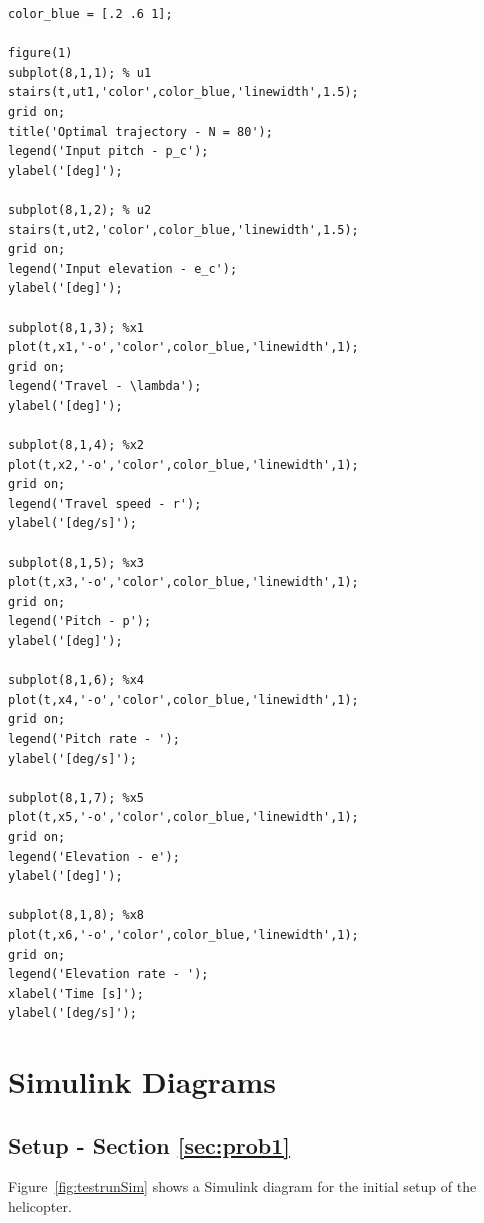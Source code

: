 \documentclass[11pt,a4paper,USenglish]{article} %
\begin{document}
\begin{verbatim}
color_blue = [.2 .6 1];

figure(1)
subplot(8,1,1); % u1
stairs(t,ut1,'color',color_blue,'linewidth',1.5);
grid on;
title('Optimal trajectory - N = 80');
legend('Input pitch - p_c');
ylabel('[deg]');

subplot(8,1,2); % u2
stairs(t,ut2,'color',color_blue,'linewidth',1.5);
grid on;
legend('Input elevation - e_c');
ylabel('[deg]');

subplot(8,1,3); %x1
plot(t,x1,'-o','color',color_blue,'linewidth',1);
grid on;
legend('Travel - \lambda');
ylabel('[deg]');

subplot(8,1,4); %x2
plot(t,x2,'-o','color',color_blue,'linewidth',1);
grid on;
legend('Travel speed - r');
ylabel('[deg/s]');

subplot(8,1,5); %x3
plot(t,x3,'-o','color',color_blue,'linewidth',1);
grid on;
legend('Pitch - p');
ylabel('[deg]');

subplot(8,1,6); %x4
plot(t,x4,'-o','color',color_blue,'linewidth',1);
grid on;
legend('Pitch rate - ');
ylabel('[deg/s]');

subplot(8,1,7); %x5
plot(t,x5,'-o','color',color_blue,'linewidth',1);
grid on;
legend('Elevation - e');
ylabel('[deg]');

subplot(8,1,8); %x8
plot(t,x6,'-o','color',color_blue,'linewidth',1);
grid on;
legend('Elevation rate - ');
xlabel('Time [s]');
ylabel('[deg/s]');
\end{verbatim}

%
\newpage


\section{Simulink Diagrams}\label{sec:simulink}
\subsection{Setup - Section \ref{sec:prob1}}\label{sec:simulink:1}
Figure~\ref{fig:testrunSim} shows a Simulink diagram for the initial setup of the helicopter.
\end{document}
